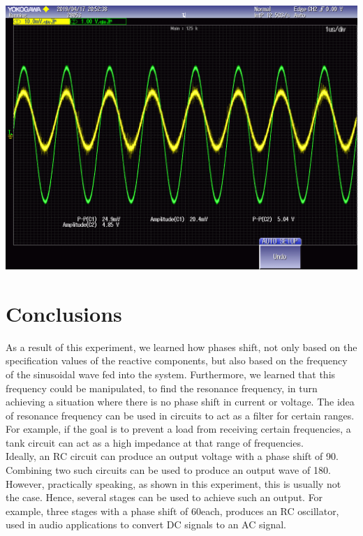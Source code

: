 \documentclass[journal]{IEEEtran}
\begin{document}
\begingroup
    \centering
    \medskip
    \includegraphics[width=\columnwidth]{images/lab8_012.png}
    \label{fig:phaseshift40}
    \medskip
\endgroup

\section{Conclusions}
\noindent As a result of this experiment, we learned how phases shift, not only based on the specification values of the reactive components, but also based on the frequency of the sinusoidal wave fed into the system. Furthermore, we learned that this frequency could be manipulated, to find the resonance frequency, in turn achieving a situation where there is no phase shift in current or voltage. The idea of resonance frequency can be used in circuits to act as a filter for certain ranges. For example, if the goal is to prevent a load from receiving certain frequencies, a tank circuit can act as a high impedance at that range of frequencies. \\

\noindent Ideally, an RC circuit can produce an output voltage with a phase shift of 90\degree. Combining two such circuits can be used to produce an output wave of 180\degree. However, practically speaking, as shown in this experiment, this is usually not the case. Hence, several stages can be used to achieve such an output. For example, three stages with a phase shift of 60\degree each, produces an RC oscillator, used in audio applications to convert DC signals to an AC signal. 

\printbibliography
\end{document}
